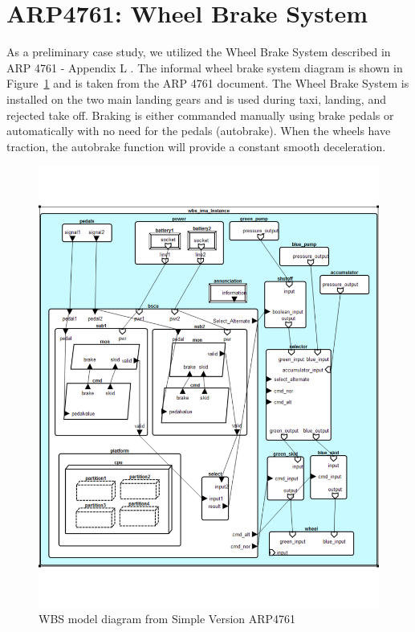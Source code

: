 \section{ARP4761: Wheel Brake System}

As a preliminary case study, we utilized the Wheel Brake System described in ARP 4761 - Appendix L \cite{AIR6110}. The informal wheel brake system diagram is shown in Figure~\ref{fig:wbs_diagram} and is taken from the ARP 4761 document. The Wheel Brake System is installed on the two main landing gears and is used during taxi, landing, and rejected take off. Braking is either commanded manually using brake pedals or automatically with no need for the pedals (autobrake). When the wheels have traction, the autobrake function will provide a constant smooth deceleration. \\

\begin{figure}[htb]
\begin{center}
\includegraphics[scale=.75]{images/Wbs-ima}
\caption{WBS model diagram from Simple Version ARP4761 }\label{fig:wbs_diagram}
\end{center}
\end{figure}

